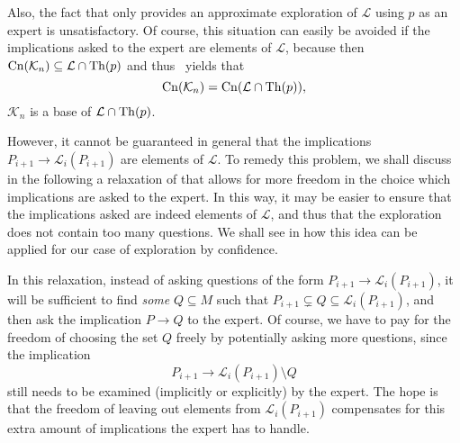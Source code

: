 Also, the fact that  only provides an approximate
exploration of $\mathcal{L}$ using $p$ as an expert is unsatisfactory.  Of course, this
situation can easily be avoided if the implications asked to the expert are elements of
$\mathcal{L}$, because then $\operatorname{Cn}(\mathcal{K}_{n}) \subseteq \mathcal{L} \cap \operatorname{Th}(p)$ and
thus~ yields that
\begin{equation*}
  \operatorname{Cn}(\mathcal{K}_{n}) = \operatorname{Cn}(\mathcal{L} \cap \operatorname{Th}(p)),
\end{equation*}
\ie $\mathcal{K}_{n}$ is a base of $\mathcal{L} \cap \operatorname{Th}(p)$.

However, it cannot be guaranteed in general that the implications $P_{i+1} \to
\mathcal{L}_{i}(P_{i+1})$ are elements of $\mathcal{L}$.  To remedy this problem, we shall
discuss in the following a relaxation of  that allows for
more freedom in the choice which implications are asked to the expert.  In this way, it
may be easier to ensure that the implications asked are indeed elements of $\mathcal{L}$,
and thus that the exploration does not contain too many questions.  We shall see in
 how this idea can be applied for our case of exploration by
confidence.

In this relaxation, instead of asking questions of the form $P_{i+1} \to
\mathcal{L}_{i}(P_{i+1})$, it will be sufficient to find \emph{some} $Q \subseteq M$ such
that $P_{i+1} \subsetneq Q \subseteq \mathcal{L}_{i}(P_{i+1})$, and then ask the
implication $P \to Q$ to the expert.  Of course, we have to pay for the freedom of
choosing the set $Q$ freely by potentially asking more questions, since the implication
\begin{equation*}
  P_{i+1} \to \mathcal{L}_{i}(P_{i+1}) \setminus Q
\end{equation*}
still needs to be examined (implicitly or explicitly) by the expert.  The hope is that the
freedom of leaving out elements from $\mathcal{L}_{i}(P_{i+1})$ compensates for this extra
amount of implications the expert has to handle.


